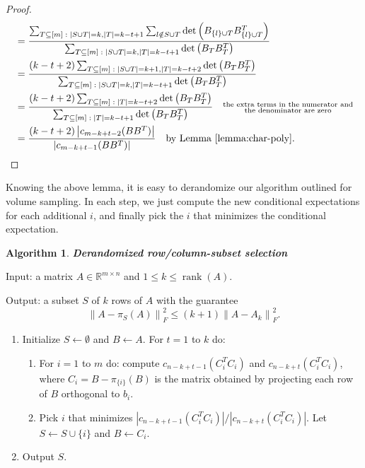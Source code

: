 \documentclass[11pt]{article}
\newcommand{\rank}{\operatorname{rank}}
\newtheorem{alg}{Algorithm}
\def\reals{\mathbb{R}}
\def\suchthat{\;:\;}
\newcommand{\deter}[1]{\operatorname{det}\left(#1\right)}
\newcommand{\frob}[1]{\left\|#1\right\|_{F}}
\newcommand{\abs}[1]{\left|#1\right|}
\newcommand{\size}[1]{\left|#1\right|}
\begin{document}
\begin{proof}
\begin{align*}
& = \frac{\sum_{T \subseteq [m] \suchthat \size{S \cup T}=k, \size{T}=k-t+1} \sum_{l \notin S \cup T} \deter{B_{\{l\} \cup T} B_{\{l\} \cup T}^{T}}}{\sum_{T \subseteq [m] \suchthat \size{S \cup T}=k, \size{T}=k-t+1} \deter{B_{T} B_{T}^{T}}} \\
& = \frac{(k-t+2) \sum_{T \subseteq [m] \suchthat \size{S \cup T}=k+1, \size{T}=k-t+2} \deter{B_{T} B_{T}^{T}}}{\sum_{T \subseteq [m] \suchthat \size{S \cup T}=k, \size{T}=k-t+1} \deter{B_{T} B_{T}^{T}}} \\
& = \frac{(k-t+2) \sum_{T \subseteq [m] \suchthat \size{T}=k-t+2} \deter{B_{T} B_{T}^{T}}}{\sum_{T \subseteq [m] \suchthat \size{T}=k-t+1} \deter{B_{T} B_{T}^{T}}} \quad \substack{\text{the extra terms in the numerator and} \\ \text{the denominator are zero}} \\
& = \frac{(k-t+2) \abs{c_{m-k+t-2} (BB^{T})}}{\abs{c_{m-k+t-1} (BB^{T})}} \quad \text{by Lemma \ref{lemma:char-poly}}.
\end{align*}
\end{proof}

Knowing the above lemma, it is easy to derandomize our algorithm outlined for volume sampling. In each step, we just compute the new conditional expectations for each additional $i$, and finally pick the $i$ that minimizes the conditional expectation.

\begin{framed}
\begin{alg} \label{alg:derand}
{\bf Derandomized row/column-subset selection}
\end{alg}
\noindent Input: a matrix $A \in \reals^{m \times n}$ and $1 \leq k \leq \rank(A)$.

\noindent Output: a subset $S$ of $k$ rows of $A$ with the guarantee
\[
\frob{A - \pi_{S}(A)}^{2} \leq (k+1) \frob{A - A_{k}}^{2}.
\]

\begin{enumerate}
\item Initialize $S \leftarrow \emptyset$ and $B \leftarrow A$. For $t=1$ to $k$ do:
\begin{enumerate}
\item For $i=1$ to $m$ do: compute $c_{n-k+t-1} (C_{i}^{T} C_{i})$ and $c_{n-k+t} (C_{i}^{T} C_{i})$, where $C_{i} = B - \pi_{\{i\}}(B)$ is the matrix obtained by projecting each row of $B$ orthogonal to $b_{i}$.
\item Pick $i$ that minimizes $\abs{c_{n-k+t-1} (C_{i}^{T} C_{i})} / \abs{c_{n-k+t} (C_{i}^{T} C_{i})}$. Let $S \leftarrow S \cup \{i\}$ and $B \leftarrow C_{i}$.
\end{enumerate}
\item Output $S$.
\end{enumerate}
\end{framed}
\end{document}
